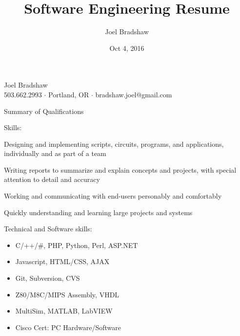\documentclass[letterpaper,10pt]{article}
\newenvironment{res_section}[1]{%
  \vskip 6pt
  \noindent
  {\Large \textbf{#1}}\\
  \rule[8pt]{\textwidth}{0.5pt}
  \vskip -8pt
}{
}
\newenvironment{res_subsection}[1]{%
  \vskip 4pt
  \noindent
  \textbf{\large{#1}}
  \begin{itemize}
}{
  \end{itemize}
}
\begin{document}
\title{Software Engineering Resume}
\author{Joel Bradshaw}
\date{Oct 4, 2016}
\begin{center}
{\Huge Joel Bradshaw}\\
\vskip 2pt
{\large 503.662.2993 \ensuremath{\cdot} Portland, OR \ensuremath{\cdot} bradshaw.joel@gmail.com}
\end{center}
\vskip -8pt
\begin{res_section}{Summary of Qualifications}
\begin{res_subsection}{Skills:}
  \item Designing and implementing scripts, circuits, programs, and applications, individually and as part of a team
  \item Writing reports to summarize and explain concepts and projects, with special attention to detail and accuracy
  \item Working and communicating with end-users personably and comfortably
  \item Quickly understanding and learning large projects and systems
  \item Technical and Software skills:
  \def \multicolsep {0pt}
  \setlength{\columnsep}{-8pt}
  \begin{multicols}{3}
  \begin{itemize}
    \item C/++/\#, PHP, Python, Perl, ASP.NET
    \item Javascript, HTML/CSS, AJAX
    \item Git, Subversion, CVS
    \item Z80/M8C/MIPS Assembly, VHDL
    \item MultiSim, MATLAB, LabVIEW
    \item Cisco Cert: PC Hardware/Software
  \end{itemize}
  \end{multicols}
\end{res_subsection}
\end{res_section}
\end{document}
